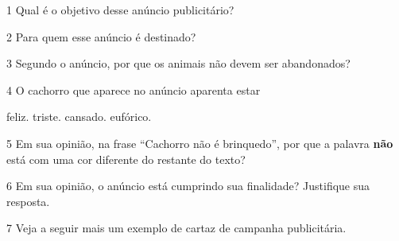 


\num{1} Qual é o objetivo desse anúncio publicitário? 


\num{2} Para quem esse anúncio é destinado? 


\num{3} Segundo o anúncio, por que os animais não devem ser abandonados? 


\num{4} O cachorro que aparece no anúncio aparenta estar

\begin{boxlist}
   feliz.
   triste.
   cansado.
   eufórico.
\end{boxlist}

\num{5} Em sua opinião, na frase ``Cachorro não é brinquedo'', por que a palavra \textbf{não} está com uma cor diferente do restante do texto?


\num{6} Em sua opinião, o anúncio está cumprindo sua finalidade? Justifique
sua resposta. 


\num{7} Veja a seguir mais um exemplo de cartaz de campanha publicitária.


